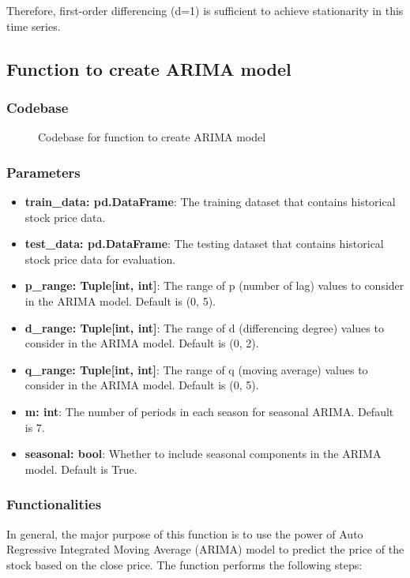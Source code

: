 \documentclass[11pt]{article}
\begin{document}
Therefore, first-order differencing (d=1) is sufficient to achieve stationarity in this time series.

\subsection{Function to create ARIMA model}

\subsubsection{Codebase}

\begin{figure}[ht]
    \centering
    \caption{Codebase for function to create ARIMA model}
    \label{fig:arima_model_code}
\end{figure}

\subsubsection{Parameters}
\begin{itemize}
    \item \textbf{train\_data: pd.DataFrame}: The training dataset that contains historical stock price data.
    \item \textbf{test\_data: pd.DataFrame}: The testing dataset that contains historical stock price data for evaluation.
    \item \textbf{p\_range: Tuple[int, int]}: The range of p (number of lag) values to consider in the ARIMA model. Default is (0, 5).
    \item \textbf{d\_range: Tuple[int, int]}: The range of d (differencing degree) values to consider in the ARIMA model. Default is (0, 2).
    \item \textbf{q\_range: Tuple[int, int]}: The range of q (moving average) values to consider in the ARIMA model. Default is (0, 5).
    \item \textbf{m: int}: The number of periods in each season for seasonal ARIMA. Default is 7.
    \item \textbf{seasonal: bool}: Whether to include seasonal components in the ARIMA model. Default is True.
\end{itemize}

\subsubsection{Functionalities}
In general, the major purpose of this function is to use the power of Auto Regressive Integrated Moving Average (ARIMA) model to predict the price of the stock based on the close price. The function performs the following steps:
\end{document}
